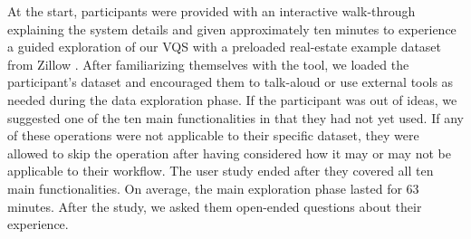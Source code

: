 \par At the start, participants were provided with an interactive walk-through explaining the system details and given approximately ten minutes to experience a guided exploration of our VQS with a preloaded real-estate example dataset from Zillow \cite{zillow}. After familiarizing themselves with the tool, we loaded the participant's dataset and encouraged them to talk-aloud or use external tools as needed during the data exploration phase.%
If the participant was out of ideas, we suggested one of the ten main functionalities in \zv {}that they had not yet used. If any of these operations were not applicable to their specific dataset, they were allowed to skip the operation after having considered how it may or may not be applicable to their workflow. The user study ended after they covered all ten main functionalities. On average, the main exploration phase lasted for 63 minutes. After the study, we asked them open-ended questions about their experience.